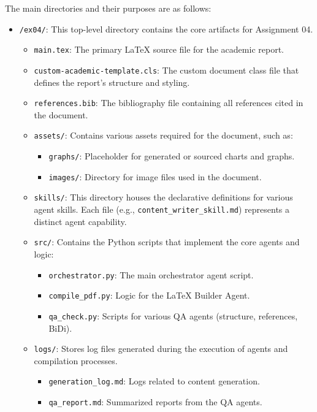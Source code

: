 \documentclass{custom-academic-template}
\begin{document}
The main directories and their purposes are as follows:
\begin{itemize}
    \item 	\texttt{/ex04/}: This top-level directory contains the core artifacts for Assignment 04.
    \begin{itemize}
        \item 	\texttt{main.tex}: The primary LaTeX source file for the academic report.
        \item 	\texttt{custom-academic-template.cls}: The custom document class file that defines the report's structure and styling.
        \item 	\texttt{references.bib}: The bibliography file containing all references cited in the document.
        \item 	\texttt{assets/}: Contains various assets required for the document, such as:
            \begin{itemize}
                \item 	\texttt{graphs/}: Placeholder for generated or sourced charts and graphs.
                \item 	\texttt{images/}: Directory for image files used in the document.
            \end{itemize}
        \item 	\texttt{skills/}: This directory houses the declarative definitions for various agent skills. Each file (e.g., 	\texttt{content\_writer\_skill.md}) represents a distinct agent capability.
        \item 	\texttt{src/}: Contains the Python scripts that implement the core agents and logic:
            \begin{itemize}
                \item 	\texttt{orchestrator.py}: The main orchestrator agent script.
                \item 	\texttt{compile\_pdf.py}: Logic for the LaTeX Builder Agent.
                \item 	\texttt{qa\_check.py}: Scripts for various QA agents (structure, references, BiDi).
            \end{itemize}
        \item 	\texttt{logs/}: Stores log files generated during the execution of agents and compilation processes.
            \begin{itemize}
                \item 	\texttt{generation\_log.md}: Logs related to content generation.
                \item 	\texttt{qa\_report.md}: Summarized reports from the QA agents.

\end{itemize}
\end{itemize}
\end{itemize}
\end{document}
